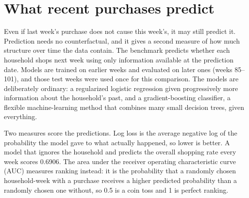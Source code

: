 \documentclass[11pt]{article}
\begin{document}
\section{What recent purchases predict}
\label{sec:prediction}

Even if last week's purchase does not cause this week's, it may still predict it. Prediction
needs no counterfactual, and it gives a second measure of how much structure over time the
data contain. The benchmark predicts whether each household shops next week using only
information available at the prediction date. Models are trained on earlier weeks and
evaluated on later ones (weeks 85--101), and those test weeks were used once for this
comparison. The models are
deliberately ordinary: a regularized logistic regression given progressively more
information about the household's past, and a gradient-boosting classifier, a flexible
machine-learning method that combines many small decision trees, given everything.

Two measures score the predictions. Log loss is the average negative log of the probability
the model gave to what actually happened, so lower is better. A model that ignores the
household and predicts the overall shopping rate every week scores 0.6906. The area under the
receiver operating characteristic curve (AUC) measures ranking instead: it is the probability
that a randomly chosen household-week with a purchase receives a higher predicted probability
than a randomly chosen one without, so 0.5 is a coin toss and 1 is perfect ranking.
\end{document}
